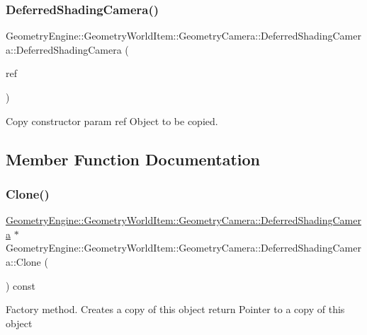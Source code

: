 \subsubsection{\texorpdfstring{DeferredShadingCamera()}{DeferredShadingCamera()}\hspace{0.1cm}{\footnotesize\ttfamily [2/2]}}
{\footnotesize\ttfamily Geometry\+Engine\+::\+Geometry\+World\+Item\+::\+Geometry\+Camera\+::\+Deferred\+Shading\+Camera\+::\+Deferred\+Shading\+Camera (\begin{DoxyParamCaption}\item[{const \mbox{\hyperlink{class_geometry_engine_1_1_geometry_world_item_1_1_geometry_camera_1_1_deferred_shading_camera}{Deferred\+Shading\+Camera}} \&}]{ref }\end{DoxyParamCaption})}

Copy constructor param ref Object to be copied. 

\subsection{Member Function Documentation}
\mbox{\label{class_geometry_engine_1_1_geometry_world_item_1_1_geometry_camera_1_1_deferred_shading_camera_ac020fe14bc32f3fdbd0c9423af1c975f}} 
\subsubsection{\texorpdfstring{Clone()}{Clone()}}
{\footnotesize\ttfamily \mbox{\hyperlink{class_geometry_engine_1_1_geometry_world_item_1_1_geometry_camera_1_1_deferred_shading_camera}{Geometry\+Engine\+::\+Geometry\+World\+Item\+::\+Geometry\+Camera\+::\+Deferred\+Shading\+Camera}} $\ast$ Geometry\+Engine\+::\+Geometry\+World\+Item\+::\+Geometry\+Camera\+::\+Deferred\+Shading\+Camera\+::\+Clone (\begin{DoxyParamCaption}{ }\end{DoxyParamCaption}) const\hspace{0.3cm}{\ttfamily [virtual]}}

Factory method. Creates a copy of this object return Pointer to a copy of this object 

